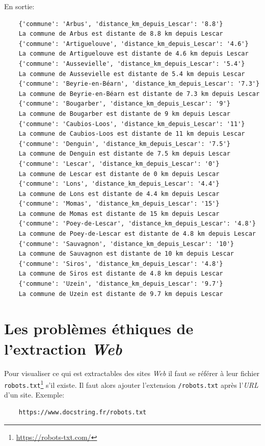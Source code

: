 \documentclass[a4paper,11pt]{book}
\begin{document}
En sortie:
\begin{verbatim}
    {'commune': 'Arbus', 'distance_km_depuis_Lescar': '8.8'}
    La commune de Arbus est distante de 8.8 km depuis Lescar
    {'commune': 'Artiguelouve', 'distance_km_depuis_Lescar': '4.6'}
    La commune de Artiguelouve est distante de 4.6 km depuis Lescar
    {'commune': 'Aussevielle', 'distance_km_depuis_Lescar': '5.4'}
    La commune de Aussevielle est distante de 5.4 km depuis Lescar
    {'commune': 'Beyrie-en-Béarn', 'distance_km_depuis_Lescar': '7.3'}
    La commune de Beyrie-en-Béarn est distante de 7.3 km depuis Lescar
    {'commune': 'Bougarber', 'distance_km_depuis_Lescar': '9'}
    La commune de Bougarber est distante de 9 km depuis Lescar
    {'commune': 'Caubios-Loos', 'distance_km_depuis_Lescar': '11'}
    La commune de Caubios-Loos est distante de 11 km depuis Lescar
    {'commune': 'Denguin', 'distance_km_depuis_Lescar': '7.5'}
    La commune de Denguin est distante de 7.5 km depuis Lescar
    {'commune': 'Lescar', 'distance_km_depuis_Lescar': '0'}
    La commune de Lescar est distante de 0 km depuis Lescar
    {'commune': 'Lons', 'distance_km_depuis_Lescar': '4.4'}
    La commune de Lons est distante de 4.4 km depuis Lescar
    {'commune': 'Momas', 'distance_km_depuis_Lescar': '15'}
    La commune de Momas est distante de 15 km depuis Lescar
    {'commune': 'Poey-de-Lescar', 'distance_km_depuis_Lescar': '4.8'}
    La commune de Poey-de-Lescar est distante de 4.8 km depuis Lescar
    {'commune': 'Sauvagnon', 'distance_km_depuis_Lescar': '10'}
    La commune de Sauvagnon est distante de 10 km depuis Lescar
    {'commune': 'Siros', 'distance_km_depuis_Lescar': '4.8'}
    La commune de Siros est distante de 4.8 km depuis Lescar
    {'commune': 'Uzein', 'distance_km_depuis_Lescar': '9.7'}
    La commune de Uzein est distante de 9.7 km depuis Lescar
\end{verbatim}
\medskip

\section{Les problèmes éthiques de l'extraction \textit{Web}}
Pour visualiser ce qui est extractables des sites \textit{Web} il faut se référer à leur fichier \texttt{robots.txt}\footnote{\url{https://robots-txt.com/}} s'il existe. Il faut alors ajouter l'extension \texttt{/robots.txt} après l'\textit{URL} d'un site. Exemple:
\begin{verbatim}
    https://www.docstring.fr/robots.txt
\end{verbatim}
\medskip
\end{document}
